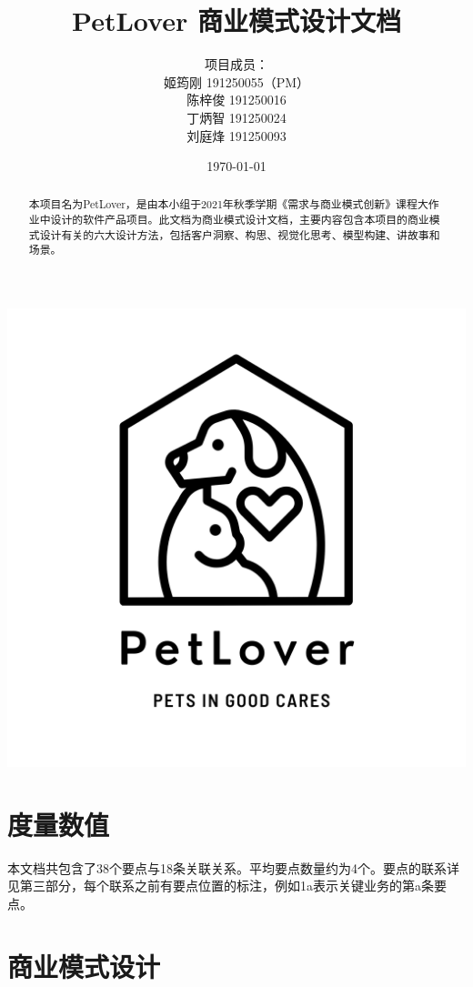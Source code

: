 \documentclass[a4paper]{ctexart}
\title{\Huge PetLover 商业模式设计文档}
\author{
  项目成员：\\
  姬筠刚 191250055（PM）\\
  陈梓俊 191250016\\
  丁炳智 191250024\\
  刘庭烽 191250093\\
}
\date{\today}
\begin{document}
\maketitle

\centerline{\includegraphics[]{logo.png}}

\newpage

\begin{abstract}
  本项目名为PetLover，是由本小组于2021年秋季学期《需求与商业模式创新》课程大作业中设计的软件产品项目。此文档为商业模式设计文档，主要内容包含本项目的商业模式设计有关的六大设计方法，包括客户洞察、构思、视觉化思考、模型构建、讲故事和场景。
\end{abstract}



\tableofcontents

\newpage

\setlength{\parskip}{1em}


\section{度量数值}

本文档共包含了38个要点与18条关联关系。平均要点数量约为4个。要点的联系详见第三部分，每个联系之前有要点位置的标注，例如1a表示关键业务的第a条要点。

\section{商业模式设计}
\end{document}
